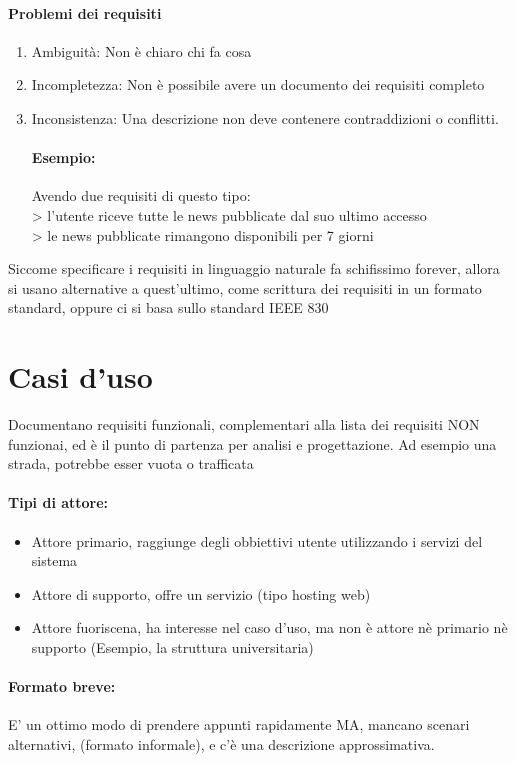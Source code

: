 \documentclass[12pt, a4paper, openany, twoside]{book}
\begin{document}
\paragraph{Problemi dei requisiti}
\begin{enumerate}
	\item Ambiguità: Non è chiaro chi fa cosa
	\item Incompletezza: Non è possibile avere un documento dei requisiti completo
	\item Inconsistenza: Una descrizione non deve contenere contraddizioni o 
	conflitti.
	\paragraph{Esempio: } Avendo due requisiti di questo tipo:\\
	> l’utente riceve tutte le news pubblicate dal suo ultimo accesso\\
	> le news pubblicate rimangono disponibili per 7 giorni	 
\end{enumerate}
Siccome specificare i requisiti in linguaggio naturale fa schifissimo forever,
allora si usano alternative a quest'ultimo, come scrittura dei requisiti in un
formato standard, oppure ci si basa sullo standard IEEE 830
\section{Casi d'uso}
Documentano requisiti funzionali, complementari alla lista dei requisiti NON
funzionai, ed è il punto di partenza per analisi e progettazione. Ad esempio una
strada, potrebbe esser vuota o trafficata
\paragraph{Tipi di attore:} 
\begin{itemize}
	\item Attore primario, raggiunge degli obbiettivi utente utilizzando i
	servizi del sistema
	\item Attore di supporto, offre un servizio (tipo hosting web)
	\item Attore fuoriscena, ha interesse nel caso d'uso, ma non è attore nè
	primario nè supporto (Esempio, la struttura universitaria)
\end{itemize}
\paragraph{Formato breve:} E' un ottimo modo di prendere appunti rapidamente MA,
mancano scenari alternativi, (formato informale), e c'è una descrizione approssimativa.
\end{document}
